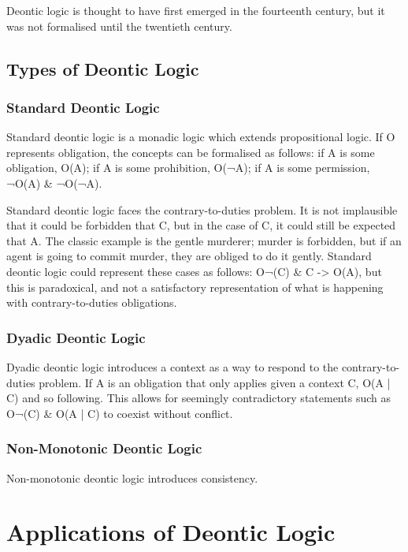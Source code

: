 \documentclass{l4proj}
\begin{document}
Deontic logic is thought to have first emerged in the fourteenth century, but it was not formalised until the twentieth century. 

\subsection{Types of Deontic Logic}

\subsubsection{Standard Deontic Logic}
Standard deontic logic is a monadic logic which extends propositional logic. If O represents obligation, the concepts can be formalised as follows: if A is some obligation, O(A); if A is some prohibition, O(¬A); if A is some permission, ¬O(A) & ¬O(¬A). 

Standard deontic logic faces the contrary-to-duties problem. It is not implausible that it could be forbidden that C, but in the case of C, it could still be expected that A. The classic example is the gentle murderer; murder is forbidden, but if an agent is going to commit murder, they are obliged to do it gently. Standard deontic logic could represent these cases as follows: O¬(C) & C -> O(A), but this is paradoxical, and not a satisfactory representation of what is happening with contrary-to-duties obligations. 

\subsubsection{Dyadic Deontic Logic}
Dyadic deontic logic introduces a context as a way to respond to the contrary-to-duties problem. If A is an obligation that only applies given a context C, O(A | C) and so following. This allows for seemingly contradictory statements such as O¬(C) & O(A | C) to coexist without conflict. 

\subsubsection{Non-Monotonic Deontic Logic}
Non-monotonic deontic logic introduces consistency\citep{Powers}. 

\section{Applications of Deontic Logic}
\end{document}
